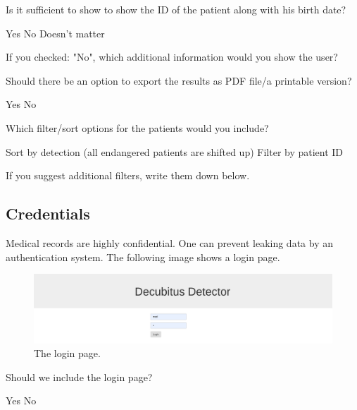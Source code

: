 \documentclass{exam}
\begin{document}
\begin{questions}
\question Is it sufficient to show to show the ID of the patient along with his birth date?

\begin{checkboxes}
	\choice Yes
	\choice No
	\choice Doesn't matter
\end{checkboxes}

If you checked: "No", which additional information would you show the user?
\vspace{4cm}

\question Should there be an option to export the results as PDF file/a printable version?

\begin{checkboxes}
	\choice Yes
	\choice No
\end{checkboxes}

\question Which filter/sort options for the patients would you include?

	\begin{checkboxes}
		\choice Sort by detection (all endangered patients are shifted up)
		\choice Filter by patient ID
	\end{checkboxes}

	If you suggest additional filters, write them down below.
	\vspace{3cm}

\end{questions}

\subsection*{Credentials}

Medical records are highly confidential. One can prevent leaking data by an authentication system. The following image shows a login page.

\begin{figure}[H]
	\centering
  \includegraphics[width=0.8\linewidth]{images/login.png}
	\captionsetup{labelformat=empty}
	\caption{The login page.}
  \label{fig:text}
\end{figure}

\begin{questions}
	\question Should we include the login page?

	\begin{checkboxes}
		\choice Yes
		\choice No
	\end{checkboxes}

\end{questions}
\end{document}
